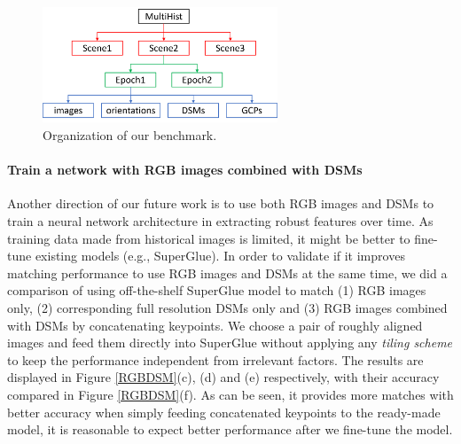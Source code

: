 \begin{figure}[htbp]
	\begin{center}
			\begin{minipage}[t]{1\linewidth}
				\centering
				\includegraphics[width=7cm]{images/Chapitre5/multihist.png}
			\end{minipage}%
		\caption{Organization of our benchmark.}
		\label{multihist}
	\end{center}
\end{figure}


\paragraph{Train a network with RGB images combined with \ac{DSM}s}
Another direction of our future work is to use both RGB images and \ac{DSM}s to train a neural network architecture in extracting robust features over time. 
As training data made from historical images is limited, it might be better to fine-tune existing models (e.g., SuperGlue). 
In order to validate if it improves matching performance to use RGB images and \ac{DSM}s at the same time, we did a comparison of using off-the-shelf SuperGlue model to match (1) RGB images only, (2) corresponding full resolution \ac{DSM}s only and (3) RGB images combined with \ac{DSM}s by concatenating keypoints. We choose a pair of roughly aligned images and feed them directly into SuperGlue without applying any \textit{tiling scheme} to keep the performance independent from irrelevant factors. The results are displayed in Figure \ref{RGBDSM}(c), (d) and (e) respectively, with their accuracy compared in Figure \ref{RGBDSM}(f). 
As can be seen, it provides more matches with better accuracy when simply feeding concatenated keypoints to the ready-made model, it is reasonable to expect better performance after we fine-tune the model. 


